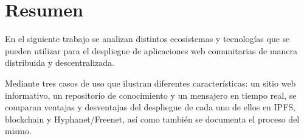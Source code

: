 \section{Resumen}

En el siguiente trabajo se analizan distintos ecosistemas y tecnologías que se pueden utilizar para el despliegue de aplicaciones web comunitarias de manera distribuida y descentralizada.

Mediante tres casos de uso que ilustran diferentes características: un sitio web informativo, un repositorio de conocimiento y un mensajero en tiempo real, se comparan ventajas y desventajas del despliegue de cada uno de ellos en IPFS, blockchain y Hyphanet/Freenet, así como también se documenta el proceso del mismo.